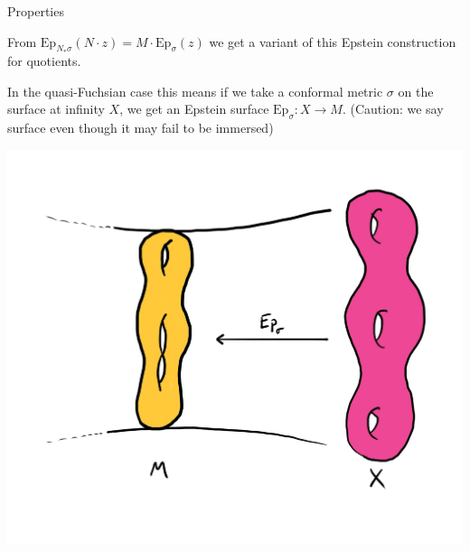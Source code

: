 \documentclass[professionalfont]{beamer}
\begin{document}
\begin{frame}{Properties}

From $\mathrm{Ep}_{N_*\sigma}(N \cdot z) = M \cdot \mathrm{Ep}_{\sigma}(z)$ we get a variant of this Epstein construction for quotients. 
\newline


In the quasi-Fuchsian case this means if we take a conformal metric $\sigma$ on the surface at infinity $X$, we get an Epstein surface $\mathrm{Ep}_\sigma: X \to M$. (Caution: we say surface even though it may fail to be immersed)

\centering\includegraphics[scale=0.11]{Quotients.jpg}

\end{frame}


\end{document}
